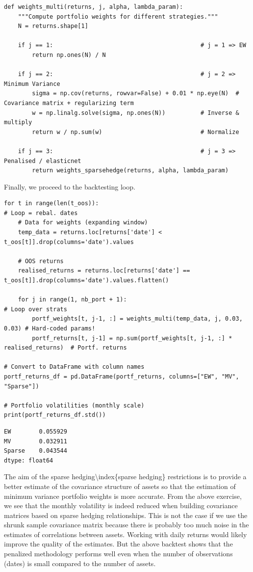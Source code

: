 \begin{verbatim}
def weights_multi(returns, j, alpha, lambda_param):
    """Compute portfolio weights for different strategies."""
    N = returns.shape[1]
    
    if j == 1:                                          # j = 1 => EW
        return np.ones(N) / N
    
    if j == 2:                                          # j = 2 => Minimum Variance
        sigma = np.cov(returns, rowvar=False) + 0.01 * np.eye(N)  # Covariance matrix + regularizing term
        w = np.linalg.solve(sigma, np.ones(N))          # Inverse & multiply
        return w / np.sum(w)                            # Normalize
    
    if j == 3:                                          # j = 3 => Penalised / elasticnet
        return weights_sparsehedge(returns, alpha, lambda_param)
\end{verbatim}

Finally, we proceed to the backtesting loop.

\begin{verbatim}
for t in range(len(t_oos)):                                              # Loop = rebal. dates
    # Data for weights (expanding window)
    temp_data = returns.loc[returns['date'] < t_oos[t]].drop(columns='date').values
    
    # OOS returns
    realised_returns = returns.loc[returns['date'] == t_oos[t]].drop(columns='date').values.flatten()
    
    for j in range(1, nb_port + 1):                                      # Loop over strats
        portf_weights[t, j-1, :] = weights_multi(temp_data, j, 0.03, 0.03) # Hard-coded params!
        portf_returns[t, j-1] = np.sum(portf_weights[t, j-1, :] * realised_returns)  # Portf. returns

# Convert to DataFrame with column names
portf_returns_df = pd.DataFrame(portf_returns, columns=["EW", "MV", "Sparse"])

# Portfolio volatilities (monthly scale)
print(portf_returns_df.std())
\end{verbatim}

\begin{verbatim}
EW        0.055929
MV        0.032911
Sparse    0.043544
dtype: float64
\end{verbatim}

The aim of the sparse hedging{\textbackslash}index\{sparse hedging\} restrictions is to provide a better estimate of the covariance structure of assets so that the estimation of minimum variance portfolio weights is more accurate. From the above exercise, we see that the monthly volatility is indeed reduced when building covariance matrices based on sparse hedging relationships. This is not the case if we use the shrunk sample covariance matrix because there is probably too much noise in the estimates of correlations between assets. Working with daily returns would likely improve the quality of the estimates. But the above backtest shows that the penalized methodology performs well even when the number of observations (dates) is small compared to the number of assets.

